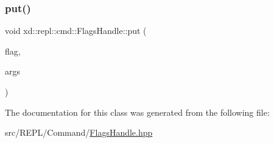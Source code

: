\mbox{\label{classxd_1_1repl_1_1cmd_1_1_flags_handle_afc48e6f51b5caf0c09b95dc8dcca5aee}} 
\subsubsection{\texorpdfstring{put()}{put()}}
{\footnotesize\ttfamily void xd\+::repl\+::cmd\+::\+Flags\+Handle\+::put (\begin{DoxyParamCaption}\item[{const \mbox{\hyperlink{classxd_1_1repl_1_1cmd_1_1_flag}{Flag}} \&}]{flag,  }\item[{\mbox{\hyperlink{classxd_1_1repl_1_1cmd_1_1_args_handle}{Args\+Handle}}}]{args }\end{DoxyParamCaption})\hspace{0.3cm}{\ttfamily [inline]}}



The documentation for this class was generated from the following file\+:\begin{DoxyCompactItemize}
\item 
src/\+R\+E\+P\+L/\+Command/\mbox{\hyperlink{_flags_handle_8hpp}{Flags\+Handle.\+hpp}}\end{DoxyCompactItemize}

